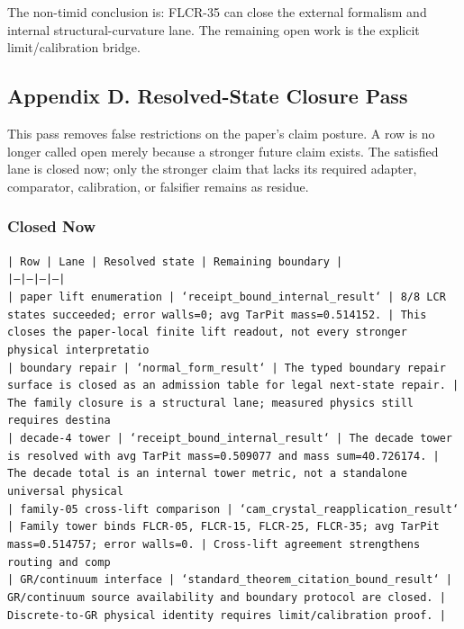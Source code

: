 \documentclass[11pt]{article}
\begin{document}
The non-timid conclusion is: FLCR-35 can close the external formalism and internal structural-curvature lane. The remaining open work is the explicit limit/calibration bridge.

\subsection*{Appendix D. Resolved-State Closure Pass}

This pass removes false restrictions on the paper's claim posture. A row is no longer called open merely because a stronger future claim exists. The satisfied lane is closed now; only the stronger claim that lacks its required adapter, comparator, calibration, or falsifier remains as residue.

\subsubsection*{Closed Now}

\noindent\texttt{| Row | Lane | Resolved state | Remaining boundary |}\\
\noindent\texttt{|---|---|---|---|}\\
\noindent\texttt{| paper lift enumeration | `receipt\_bound\_internal\_result` | 8/8 LCR states succeeded; error walls=0; avg TarPit mass=0.514152. | This closes the paper-local finite lift readout, not every stronger physical interpretatio}\\
\noindent\texttt{| boundary repair | `normal\_form\_result` | The typed boundary repair surface is closed as an admission table for legal next-state repair. | The family closure is a structural lane; measured physics still requires destina}\\
\noindent\texttt{| decade-4 tower | `receipt\_bound\_internal\_result` | The decade tower is resolved with avg TarPit mass=0.509077 and mass sum=40.726174. | The decade total is an internal tower metric, not a standalone universal physical }\\
\noindent\texttt{| family-05 cross-lift comparison | `cam\_crystal\_reapplication\_result` | Family tower binds FLCR-05, FLCR-15, FLCR-25, FLCR-35; avg TarPit mass=0.514757; error walls=0. | Cross-lift agreement strengthens routing and comp}\\
\noindent\texttt{| GR/continuum interface | `standard\_theorem\_citation\_bound\_result` | GR/continuum source availability and boundary protocol are closed. | Discrete-to-GR physical identity requires limit/calibration proof. |}\\
\end{document}

